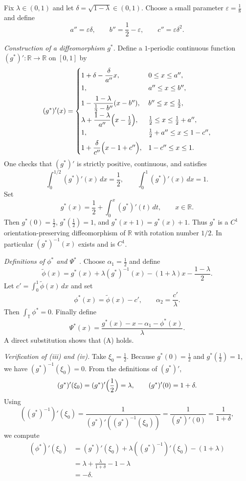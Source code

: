 \documentclass{amsart}
\newcommand{\T}{\mathbb{T}}
\begin{document}
		
		
		Fix $\lambda\in(0,1)$ and let $\delta=\sqrt{1-\lambda}\in(0,1)$.
		Choose a small parameter $\varepsilon=\frac18$ and define
		\[
		a''=\varepsilon\delta,\qquad b''=\frac12-\varepsilon,\qquad c''=\varepsilon\delta^2.
		\]
		
		\vspace{1ex}
		
		\noindent\textit{Construction of a diffeomorphism $g^*$.}
		Define a $1$-periodic continuous function $(g^*)':\mathbb{R}\to\mathbb{R}$ on $[0,1]$ by
		\[
		(g^*)'(x)=
		\begin{cases}
			1+\delta-\dfrac{\delta}{a''}x, & 0\le x\le a'',\\[4pt]
			1, & a''\le x\le b'',\\[4pt]
			1-\dfrac{1-\lambda}{\frac12-b''}(x-b''), & b''\le x\le\frac12,\\[4pt]
			\lambda+\dfrac{1-\lambda}{a''}\Bigl(x-\frac12\Bigr), & \frac12\le x\le\frac12+a'',\\[4pt]
			1, & \frac12+a''\le x\le 1-c'',\\[4pt]
			1+\dfrac{\delta}{c''}\Bigl(x-1+c''\Bigr), & 1-c''\le x\le 1.
		\end{cases}
		\]
		One checks that $(g^*)'$ is strictly positive, continuous, and satisfies
		\[
		\int_0^{1/2} (g^*)'(x)\,dx = \frac12,\qquad
		\int_0^1 (g^*)'(x)\,dx = 1.
		\]
		Set
		\[
		g^*(x)=\frac12+\int_0^x (g^*)'(t)\,dt,\qquad x\in\mathbb{R}.
		\]
		Then $g^*(0)=\frac12$, $ g^*(\frac12)=1$, and $g^*(x+1)=g^*(x)+1$.
		Thus $g^*$ is a $C^1$ orientation-preserving diffeomorphism of $\mathbb{R}$ with
		rotation number $1/2$. In particular $(g^*)^{-1}(x)$ exists and is $C^1$.
		
		\vspace{1ex}
		
		\noindent\textit{Definitions of $\phi^*$ and $\Psi^*$ .}
		Choose $\alpha_1=\frac12$ and define
		\[
		\widetilde\phi(x)=g^*(x)+\lambda (g^*)^{-1}(x)-(1+\lambda)x-\frac{1-\lambda}{2}.
		\]
		Let $c'=\int_0^1\widetilde\phi(x)\,dx$ and set
		\[
		\phi^*(x)=\widetilde\phi(x)-c',\qquad
		\alpha_2=\frac{c'}{\lambda}.
		\]
		Then $\int_{\T}\phi^*=0$.  Finally define
		\[
		\Psi^*(x)=\frac{g^*(x)-x-\alpha_1-\phi^*(x)}{\lambda}.
		\]
		A direct substitution shows that (A) holds.
		
		\vspace{1ex}
		
		\noindent\textit{Verification of (iii) and (iv).}
		Take $\xi_0=\frac12$.  Because $g^*(0)=\frac12$ and $g^*(\frac12)=1$, we have
		$(g^*)^{-1}(\xi_0)=0$.  From the definitions of $(g^*)'$,
		\[
		(g^*)'(\xi_0)=(g^*)'\Bigl(\frac12\Bigr)=\lambda,\qquad
		(g^*)'(0)=1+\delta.
		\]
		Using \[((g^*)^{-1})'(\xi_0)=\frac{1}{(g^*)'((g^*)^{-1}(\xi_0))}=\frac{1}{(g^*)'(0)}=\frac{1}{1+\delta},\] we compute
		\begin{align*}
			\left(\phi^*\right)'(\xi_0) &= (g^*)'(\xi_0)+\lambda((g^*)^{-1})'(\xi_0)-(1+\lambda) \\
			&= \lambda+\frac{\lambda}{1+\delta}-1-\lambda \\
			&= -\delta.
		\end{align*}
		
\end{document}
